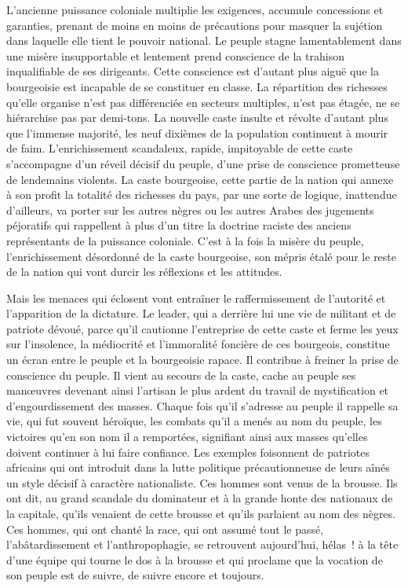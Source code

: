 \documentclass[french,twoside]{book} %
\begin{document}
L’ancienne puissance coloniale multiplie les exigences, accumule concessions et garanties, prenant de moins en moins de précautions pour masquer la sujétion dans laquelle elle tient le pouvoir national. Le peuple stagne lamentablement dans une misère insupportable et lentement prend conscience de la trahison inqualifiable de ses dirigeants. Cette conscience est d’autant plus aiguë que la bourgeoisie est incapable de se constituer en classe. La répartition des richesses qu’elle organise n’est pas différenciée en secteurs multiples, n’est pas étagée, ne se hiérarchise pas par demi-tons. La nouvelle caste insulte et révolte d’autant plus que l’immense majorité, les neuf dixièmes de la population continuent à mourir de faim. L’enrichissement scandaleux, rapide, impitoyable de cette caste s’accompagne d’un réveil décisif du peuple, d’une prise de conscience prometteuse de lendemains violents. La caste bourgeoise, cette partie de la nation qui annexe à son profit la totalité des richesses du pays, par une sorte de logique, inattendue d’ailleurs, va porter sur les autres nègres ou les autres Arabes des jugements péjoratifs qui rappellent à plus d’un titre la doctrine raciste des anciens représentants de la puissance coloniale. C’est à la fois la misère du peuple, l’enrichissement désordonné de la caste bourgeoise, son   mépris étalé pour le reste de la nation qui vont durcir les réflexions et les attitudes.\par
\bigbreak
\noindent Mais les menaces qui éclosent vont entraîner le raffermissement de l’autorité et l’apparition de la dictature. Le leader, qui a derrière lui une vie de militant et de patriote dévoué, parce qu’il cautionne l’entreprise de cette caste et ferme les yeux sur l’insolence, la médiocrité et l’immoralité foncière de ces bourgeois, constitue un écran entre le peuple et la bourgeoisie rapace. Il contribue à freiner la prise de conscience du peuple. Il vient au secours de la caste, cache au peuple ses manœuvres devenant ainsi l’artisan le plus ardent du travail de mystification et d’engourdissement des masses. Chaque fois qu’il s’adresse au peuple il rappelle sa vie, qui fut souvent héroïque, les combats qu’il a menés au nom du peuple, les victoires qu’en son nom il a remportées, signifiant ainsi aux masses qu’elles doivent continuer à lui faire confiance. Les exemples foisonnent de patriotes africains qui ont introduit dans la lutte politique précautionneuse de leurs aînés un style décisif à caractère nationaliste. Ces hommes sont venus de la brousse. Ils ont dit, au grand scandale du dominateur et à la grande honte des nationaux de la capitale, qu’ils venaient de cette brousse et qu’ils parlaient au nom des nègres. Ces hommes, qui ont chanté la race, qui ont assumé tout le passé, l’abâtardissement et l’anthropophagie, se retrouvent aujourd’hui, hélas ! à la tête d’une équipe qui tourne le dos à la brousse et qui proclame que la vocation de son peuple est de suivre, de suivre encore et toujours.\par
\end{document}
